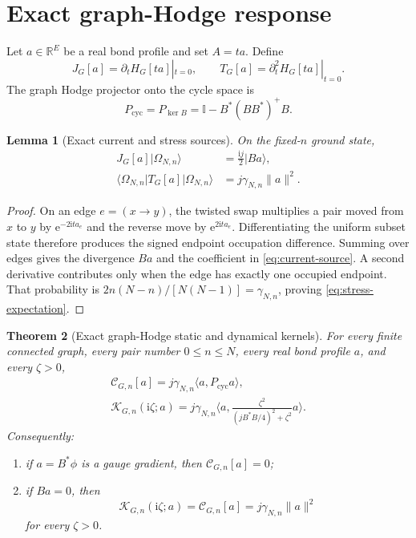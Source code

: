 \documentclass[11pt]{article}
\newtheorem{theorem}{Theorem}[section]
\newtheorem{lemma}[theorem]{Lemma}
\theoremstyle{definition}
\theoremstyle{remark}
\newcommand{\cK}{\mathcal K}
\newcommand{\cC}{\mathcal C}
\newcommand{\Id}{\mathbb I}
\newcommand{\I}{\mathrm i}
\newcommand{\e}{\mathrm e}
\newcommand{\ket}[1]{\lvert #1\rangle}
\newcommand{\bra}[1]{\langle #1\rvert}
\newcommand{\norm}[1]{\lVert #1\rVert}
\newcommand{\ip}[2]{\langle #1,#2\rangle}
\newcommand{\Pcyc}{P_{\mathrm{cyc}}}
\begin{document}
\section{Exact graph-Hodge response}
\label{sec:Hodge-response}

Let $a\in\mathbb R^E$ be a real bond profile and set $A=ta$.  Define
\begin{equation}
 J_G[a]=\partial_tH_G[ta]|_{t=0},
 \qquad
 T_G[a]=\partial_t^2H_G[ta]|_{t=0}.
\end{equation}
The graph Hodge projector onto the cycle space is
\begin{equation}
 \Pcyc
 =P_{\ker B}
 =\Id-B^*(BB^*)^+B.
 \label{eq:Hodge-projector}
\end{equation}

\begin{lemma}[Exact current and stress sources]
\label{lem:source-stress}
On the fixed-$n$ ground state,
\begin{align}
 J_G[a]\ket{\Omega_{N,n}}
 &=\frac{\I j}{2}\ket{Ba},
 \label{eq:current-source}\\
 \bra{\Omega_{N,n}}T_G[a]\ket{\Omega_{N,n}}
 &=j\gamma_{N,n}\norm a^2.
 \label{eq:stress-expectation}
\end{align}
\end{lemma}

\begin{proof}
On an edge $e=(x\to y)$, the twisted swap multiplies a pair moved from $x$ to $y$ by
$\e^{-2\I t a_e}$ and the reverse move by $\e^{2\I t a_e}$.  Differentiating the uniform subset state
therefore produces the signed endpoint occupation difference.  Summing over edges gives the divergence
$Ba$ and the coefficient in \eqref{eq:current-source}.  A second derivative contributes only when the
edge has exactly one occupied endpoint.  That probability is
$2n(N-n)/[N(N-1)]=\gamma_{N,n}$, proving \eqref{eq:stress-expectation}.
\end{proof}

\begin{theorem}[Exact graph-Hodge static and dynamical kernels]
\label{thm:graph-Hodge}
For every finite connected graph, every pair number $0\le n\le N$, every real bond profile $a$, and every
$\zeta>0$,
\begin{align}
 \boxed{
 \cC_{G,n}[a]
 =j\gamma_{N,n}\ip{a}{\Pcyc a},}
 \label{eq:static-Hodge}\\
 \boxed{
 \cK_{G,n}(\I\zeta;a)
 =j\gamma_{N,n}
 \ip{a}{\frac{\zeta^2}{(jB^*B/4)^2+\zeta^2}a}.}
 \label{eq:dynamical-Hodge}
\end{align}
Consequently:
\begin{enumerate}[label=\textup{(\roman*)},leftmargin=2.6em]
\item if $a=B^*\phi$ is a gauge gradient, then $\cC_{G,n}[a]=0$;
\item if $Ba=0$, then
\begin{equation}
 \cK_{G,n}(\I\zeta;a)=\cC_{G,n}[a]
 =j\gamma_{N,n}\norm a^2
 \label{eq:transverse-exact}
\end{equation}
for every $\zeta>0$.
\end{enumerate}
\end{theorem}
\end{document}
